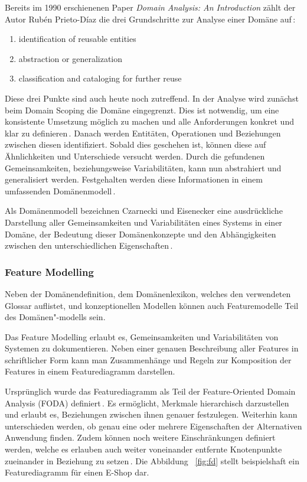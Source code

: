 \documentclass[12pt,oneside,a4paper,parskip]{scrbook}
\begin{document}
Bereits im 1990 erschienenen Paper \textit{Domain Analysis: An Introduction} zählt der Autor Rubén Prieto-Díaz die drei Grundschritte zur Analyse einer Domäne auf\,\cite{prieto1990}:

\begin{enumerate}[itemsep=-10pt]
\item identification of reusable entities
\item abstraction or generalization
\item classification and cataloging for further reuse
\end{enumerate}

Diese drei Punkte sind auch heute noch zutreffend. In der Analyse wird zunächst beim Domain Scoping die Domäne eingegrenzt. Dies ist notwendig, um eine konsistente Umsetzung möglich zu machen und alle Anforderungen konkret und klar zu definieren\,\cite[S.\,239]{stahl2007}. Danach werden Entitäten, Operationen und Beziehungen zwischen diesen identifiziert. Sobald dies geschehen ist, können diese auf Ähnlichkeiten und Unterschiede versucht werden. Durch die gefundenen Gemeinsamkeiten, beziehungsweise Variabilitäten, kann nun abstrahiert und generalisiert werden. Festgehalten werden diese Informationen in einem umfassenden Domänenmodell\,\cite[S.\,24ff.]{czaeis2000}.

Als Domänenmodell bezeichnen Czarnecki und Eisenecker eine ausdrückliche Darstellung aller Gemeinsamkeiten und Variabilitäten eines Systems in einer Domäne, der Bedeutung dieser Domänenkonzepte und den Abhängigkeiten zwischen den unterschiedlichen Eigenschaften\,\cite[S.\,23f.]{czaeis2000}.

\subsubsection{Feature Modelling}

Neben der Domänendefinition, dem Domänenlexikon, welches den verwendeten Glossar auflistet, und konzeptionellen Modellen können auch Featuremodelle Teil des Domänen"-modells sein.

Das Feature Modelling erlaubt es, Gemeinsamkeiten und Variabilitäten von Systemen zu dokumentieren. Neben einer genauen Beschreibung aller Features in schriftlicher Form kann man Zusammenhänge und Regeln zur Komposition der Features in einem Featurediagramm darstellen.

Ursprünglich wurde das Featurediagramm als Teil der Feature-Oriented Domain Analysis (FODA) definiert\,\cite{kang1990}. Es ermöglicht, Merkmale hierarchisch darzustellen und erlaubt es, Beziehungen zwischen ihnen genauer festzulegen. Weiterhin kann unterschieden werden, ob genau eine oder mehrere Eigenschaften der Alternativen Anwendung finden. Zudem können noch weitere Einschränkungen definiert werden, welche es erlauben auch weiter voneinander entfernte Knotenpunkte zueinander in Beziehung zu setzen\,\cite[S.\,240f.]{stahl2007}. Die Abbildung ~\ref{fig:fd} stellt beispielshaft ein Featurediagramm für einen E-Shop dar.
\end{document}
